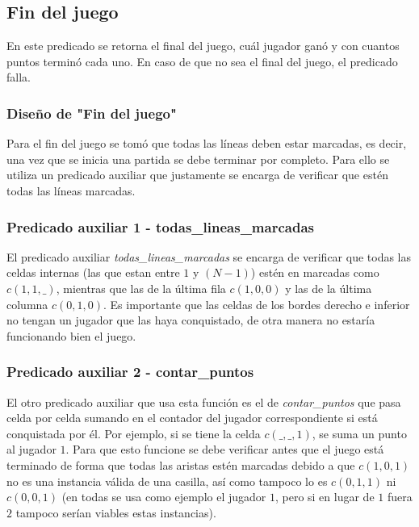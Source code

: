 \documentclass[12pt]{article} %
\begin{document}
			\newpage
		\subsection{Fin del juego}
		En este predicado se retorna el final del juego, cuál jugador ganó y con cuantos puntos terminó cada uno. En caso de que no sea el final del juego, el predicado falla.
		
			\subsubsection{Diseño de "Fin del juego"}
			Para el fin del juego se tomó que todas las líneas deben estar marcadas, es decir, una vez que se inicia una partida se debe terminar por completo. Para ello se utiliza un predicado auxiliar que justamente se encarga de verificar que estén todas las líneas marcadas.\\
			
			\subsubsection{Predicado auxiliar 1 - todas\_lineas\_marcadas}
			El predicado auxiliar \textit{todas\_lineas\_marcadas} se encarga de verificar que todas las celdas internas (las que estan entre $1$ y $(N-1)$) estén en marcadas como $c(1,1,\_)$, mientras que las de la última fila $c(1,0,0)$ y las de la última columna $c(0,1,0)$. Es importante que las celdas de los bordes derecho e inferior no tengan un jugador que las haya conquistado, de otra manera no estaría funcionando bien el juego.\\
			
			\subsubsection{Predicado auxiliar 2 - contar\_puntos}
			El otro predicado auxiliar que usa esta función es el de \textit{contar\_puntos} que pasa celda por celda sumando en el contador del jugador correspondiente si está conquistada por él. Por ejemplo, si se tiene la celda $c(\_,\_,1)$, se suma un punto al jugador $1$. Para que esto funcione se debe verificar antes que el juego está terminado de forma que todas las aristas estén marcadas debido a que $c(1,0,1)$ no es una instancia válida de una casilla, así como tampoco lo es $c(0,1,1)$ ni $c(0,0,1)$ (en todas se usa como ejemplo el jugador $1$, pero si en lugar de $1$ fuera $2$ tampoco serían viables estas instancias).
			
\end{document}
